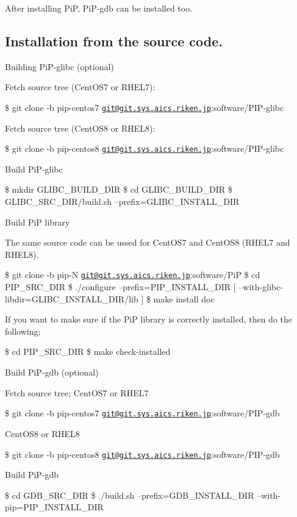 After installing Pi\-P, Pi\-P-\/gdb can be installed too.

\subsection*{Installation from the source code.}


\begin{DoxyEnumerate}
\item Building Pi\-P-\/glibc (optional)

Fetch source tree (Cent\-O\-S7 or R\-H\-E\-L7)\-:

\$ git clone -\/b pip-\/centos7 \href{mailto:git@git.sys.aics.riken.jp}{\tt git@git.\-sys.\-aics.\-riken.\-jp}\-:software/\-P\-I\-P-\/glibc

Fetch source tree (Cent\-O\-S8 or R\-H\-E\-L8)\-:

\$ git clone -\/b pip-\/centos8 \href{mailto:git@git.sys.aics.riken.jp}{\tt git@git.\-sys.\-aics.\-riken.\-jp}\-:software/\-P\-I\-P-\/glibc

Build Pi\-P-\/glibc

\$ mkdir G\-L\-I\-B\-C\-\_\-\-B\-U\-I\-L\-D\-\_\-\-D\-I\-R \$ cd G\-L\-I\-B\-C\-\_\-\-B\-U\-I\-L\-D\-\_\-\-D\-I\-R \$ G\-L\-I\-B\-C\-\_\-\-S\-R\-C\-\_\-\-D\-I\-R/build.\-sh --prefix=G\-L\-I\-B\-C\-\_\-\-I\-N\-S\-T\-A\-L\-L\-\_\-\-D\-I\-R
\item Build Pi\-P library

The same source code can be ussed for Cent\-O\-S7 and Cent\-O\-S8 (R\-H\-E\-L7 and R\-H\-E\-L8).

\$ git clone -\/b pip-\/\-N \href{mailto:git@git.sys.aics.riken.jp}{\tt git@git.\-sys.\-aics.\-riken.\-jp}\-:software/\-Pi\-P \$ cd P\-I\-P\-\_\-\-S\-R\-C\-\_\-\-D\-I\-R \$ ./configure --prefix=P\-I\-P\-\_\-\-I\-N\-S\-T\-A\-L\-L\-\_\-\-D\-I\-R \mbox{[} --with-\/glibc-\/libdir=G\-L\-I\-B\-C\-\_\-\-I\-N\-S\-T\-A\-L\-L\-\_\-\-D\-I\-R/lib \mbox{]} \$ make install doc

If you want to make sure if the Pi\-P library is correctly installed, then do the following;

\$ cd P\-I\-P\-\_\-\-S\-R\-C\-\_\-\-D\-I\-R \$ make check-\/installed
\item Build Pi\-P-\/gdb (optional)

Fetch source tree; Cent\-O\-S7 or R\-H\-E\-L7

\$ git clone -\/b pip-\/centos7 \href{mailto:git@git.sys.aics.riken.jp}{\tt git@git.\-sys.\-aics.\-riken.\-jp}\-:software/\-P\-I\-P-\/gdb

Cent\-O\-S8 or R\-H\-E\-L8

\$ git clone -\/b pip-\/centos8 \href{mailto:git@git.sys.aics.riken.jp}{\tt git@git.\-sys.\-aics.\-riken.\-jp}\-:software/\-P\-I\-P-\/gdb

Build Pi\-P-\/gdb

\$ cd G\-D\-B\-\_\-\-S\-R\-C\-\_\-\-D\-I\-R \$ ./build.sh --prefix=G\-D\-B\-\_\-\-I\-N\-S\-T\-A\-L\-L\-\_\-\-D\-I\-R --with-\/pip=P\-I\-P\-\_\-\-I\-N\-S\-T\-A\-L\-L\-\_\-\-D\-I\-R
\end{DoxyEnumerate}

